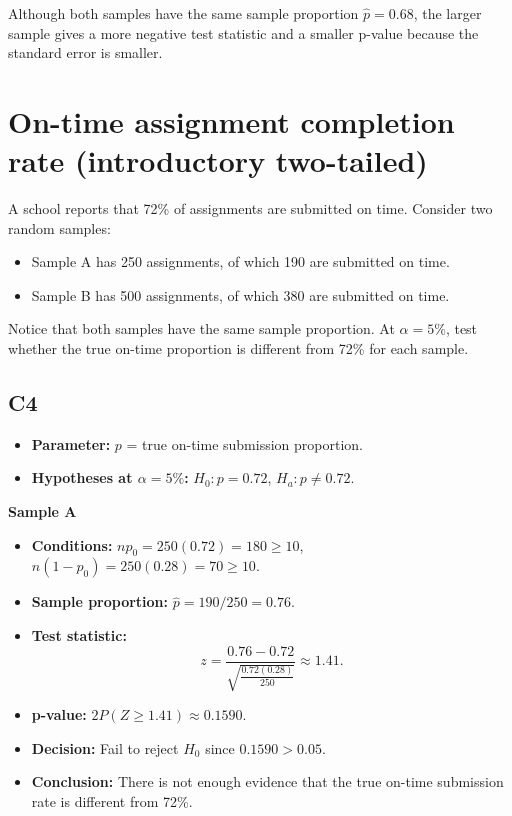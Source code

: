 \begin{center}
\end{center}


Although both samples have the same sample proportion \(\hat p=0.68\), the larger sample gives a more negative test statistic and a smaller p-value because the standard error is smaller.
\section{On-time assignment completion rate (introductory two-tailed)}
A school reports that 72\% of assignments are submitted on time. Consider two random samples:
\begin{itemize}
	\item Sample A has 250 assignments, of which 190 are submitted on time.
	\item Sample B has 500 assignments, of which 380 are submitted on time.
\end{itemize}
Notice that both samples have the same sample proportion. At \(\alpha=5\%\), test whether the true on-time proportion is different from 72\% for each sample.

\subsection*{C4}
\begin{itemize}
	\item \textbf{Parameter:} \(p\) = true on-time submission proportion.
	\item \textbf{Hypotheses at \(\alpha=5\%\):} \(H_0\colon p=0.72\), \(H_a\colon p\ne0.72\).
\end{itemize}

\textbf{Sample A}

\begin{itemize}
	\item \textbf{Conditions:} \(np_0=250(0.72)=180\ge10\), \(n(1-p_0)=250(0.28)=70\ge10\).
	\item \textbf{Sample proportion:} \(\hat p=190/250=0.76\).
	\item \textbf{Test statistic:}
	\[
	z=\frac{0.76-0.72}{\sqrt{\frac{0.72(0.28)}{250}}}\approx 1.41.
	\]
	\item \textbf{p-value:} \(2P(Z\ge 1.41)\approx 0.1590\).
	\item \textbf{Decision:} Fail to reject \(H_0\) since \(0.1590>0.05\).
	\item \textbf{Conclusion:} There is not enough evidence that the true on-time submission rate is different from 72\%.
\end{itemize}

